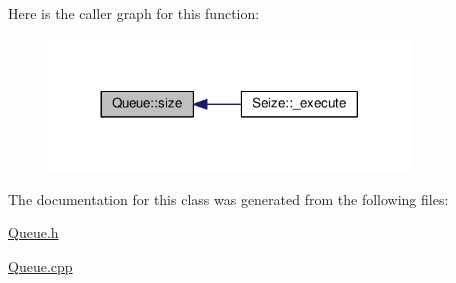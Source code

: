 Here is the caller graph for this function\+:\nopagebreak
\begin{figure}[H]
\begin{center}
\leavevmode
\includegraphics[width=272pt]{class_queue_a4cd92f99b7abc9ec4df32690dc5a037d_icgraph}
\end{center}
\end{figure}




The documentation for this class was generated from the following files\+:\begin{DoxyCompactItemize}
\item 
\hyperlink{_queue_8h}{Queue.\+h}\item 
\hyperlink{_queue_8cpp}{Queue.\+cpp}\end{DoxyCompactItemize}
